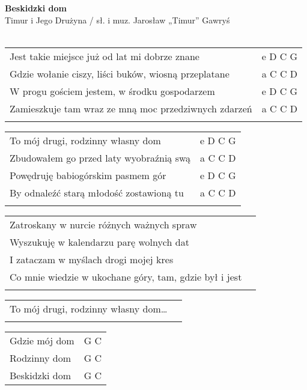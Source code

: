 \documentclass[a5paper]{article}
\begin{document}


\noindent
\fontsize{12pt}{15pt}\selectfont
\textbf{Beskidzki dom} \\
\fontsize{8pt}{10pt}\selectfont
Timur i Jego Drużyna / sł. i muz. Jarosław „Timur” Gawryś \\ \\
\fontsize{10pt}{12pt}\selectfont
{}
\begin{tabular}{@{}p{9.50cm}p{3cm}@{}}
\noindent
Jest takie miejsce już od lat mi dobrze znane & e D C G \\
Gdzie wołanie ciszy, liści buków, wiosną przeplatane & a C C D \\
W progu gościem jestem, w środku gospodarzem & e D C G \\
Zamieszkuje tam wraz ze mną moc przedziwnych zdarzeń & a C C D \\\\
\end{tabular}

\noindent
\begin{tabular}{@{}p{8.50cm}p{3cm}@{}}
To mój drugi, rodzinny własny dom & e D C G \\
Zbudowałem go przed laty wyobraźnią swą & a C C D \\
Powędruję babiogórskim pasmem gór & e D C G \\
By odnaleźć starą młodość zostawioną tu & a C C D \\ \\
\end{tabular}

\noindent
\begin{tabular}{@{}p{11.50cm}p{3cm}@{}}
Zatroskany w nurcie różnych ważnych spraw \\
Wyszukuję w kalendarzu parę wolnych dat \\
I zataczam w myślach drogi mojej kres \\
Co mnie wiedzie w ukochane góry, tam, gdzie był i jest \\ \\
\end{tabular}

\noindent
\begin{tabular}{@{}p{9.50cm}p{3cm}@{}}
To mój drugi, rodzinny własny dom… \\ \\
\end{tabular}

\noindent
\begin{tabular}{@{}p{7.50cm}p{3cm}@{}}
Gdzie mój dom & G C \\
Rodzinny dom & G C  \\
Beskidzki dom & G C 
\end{tabular}
\end{document}
